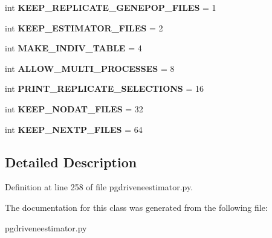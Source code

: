 \begin{DoxyCompactItemize}
\item 
int {\bfseries K\+E\+E\+P\+\_\+\+R\+E\+P\+L\+I\+C\+A\+T\+E\+\_\+\+G\+E\+N\+E\+P\+O\+P\+\_\+\+F\+I\+L\+ES} = 1\hypertarget{classnegui_1_1pgdriveneestimator_1_1DebugMode_a28d1c7693a4bec8f391bef360d51b463}{}\label{classnegui_1_1pgdriveneestimator_1_1DebugMode_a28d1c7693a4bec8f391bef360d51b463}

\item 
int {\bfseries K\+E\+E\+P\+\_\+\+E\+S\+T\+I\+M\+A\+T\+O\+R\+\_\+\+F\+I\+L\+ES} = 2\hypertarget{classnegui_1_1pgdriveneestimator_1_1DebugMode_a2f02d51f5d3a4a6c9cfaa8d0f6ea1879}{}\label{classnegui_1_1pgdriveneestimator_1_1DebugMode_a2f02d51f5d3a4a6c9cfaa8d0f6ea1879}

\item 
int {\bfseries M\+A\+K\+E\+\_\+\+I\+N\+D\+I\+V\+\_\+\+T\+A\+B\+LE} = 4\hypertarget{classnegui_1_1pgdriveneestimator_1_1DebugMode_a1f5d7e71208d6a4a9d7a63b0207e1ab8}{}\label{classnegui_1_1pgdriveneestimator_1_1DebugMode_a1f5d7e71208d6a4a9d7a63b0207e1ab8}

\item 
int {\bfseries A\+L\+L\+O\+W\+\_\+\+M\+U\+L\+T\+I\+\_\+\+P\+R\+O\+C\+E\+S\+S\+ES} = 8\hypertarget{classnegui_1_1pgdriveneestimator_1_1DebugMode_af0b037fef1711a912d1f83ed61f57097}{}\label{classnegui_1_1pgdriveneestimator_1_1DebugMode_af0b037fef1711a912d1f83ed61f57097}

\item 
int {\bfseries P\+R\+I\+N\+T\+\_\+\+R\+E\+P\+L\+I\+C\+A\+T\+E\+\_\+\+S\+E\+L\+E\+C\+T\+I\+O\+NS} = 16\hypertarget{classnegui_1_1pgdriveneestimator_1_1DebugMode_a238432e744ac313e2ce4d7de801ffe92}{}\label{classnegui_1_1pgdriveneestimator_1_1DebugMode_a238432e744ac313e2ce4d7de801ffe92}

\item 
int {\bfseries K\+E\+E\+P\+\_\+\+N\+O\+D\+A\+T\+\_\+\+F\+I\+L\+ES} = 32\hypertarget{classnegui_1_1pgdriveneestimator_1_1DebugMode_ac55e866ab4d12b084f2480d625c9dbb8}{}\label{classnegui_1_1pgdriveneestimator_1_1DebugMode_ac55e866ab4d12b084f2480d625c9dbb8}

\item 
int {\bfseries K\+E\+E\+P\+\_\+\+N\+E\+X\+T\+P\+\_\+\+F\+I\+L\+ES} = 64\hypertarget{classnegui_1_1pgdriveneestimator_1_1DebugMode_a13096a90911741639b1eea0e1595cb2b}{}\label{classnegui_1_1pgdriveneestimator_1_1DebugMode_a13096a90911741639b1eea0e1595cb2b}

\end{DoxyCompactItemize}


\subsection{Detailed Description}


Definition at line 258 of file pgdriveneestimator.\+py.



The documentation for this class was generated from the following file\+:\begin{DoxyCompactItemize}
\item 
pgdriveneestimator.\+py\end{DoxyCompactItemize}
